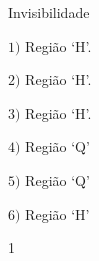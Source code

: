 \begin{answer}{Invisibilidade}
{\begin{multicols}{3}
\centering

\(1)\) Região ‘H’.

\(2)\) Região ‘H’.

\(3)\) Região ‘H’.

\(4)\) Região ‘Q’

\(5)\) Região ‘Q’

\(6)\) Região ‘H’
\end{multicols}

}{1}
\end{answer}

\label{\detokenize{AF209-6:sec-funcao-quadratica-praticando-parabola-lg}}\label{\detokenize{AF209-6:praticando}}
\phantom{a}
\vspace{-1em}
\vspace{-3\parskip}

